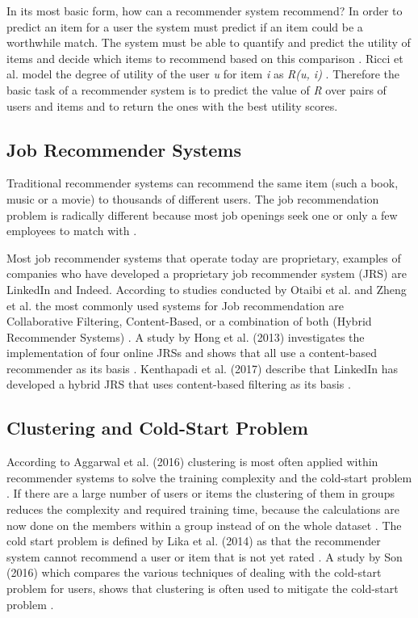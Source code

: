 In its most basic form, how can a recommender system recommend? 
In order to predict an item for a user the system must predict if an item could be a worthwhile match. 
The system must be able to quantify and predict the utility of items and decide which items to recommend based on this comparison \cite{2015RecommenderHandbook}. 
Ricci et al. model the degree of utility of the user \textit{u} for item \textit{i} as \textit{R(u, i)} \cite{Ricci2018RecommenderTechniques}. 
Therefore the basic task of a recommender system is to predict the value of \textit{R} over pairs of users and items and to return the ones with the best utility scores.

\subsection{Job Recommender Systems}
\label{sec:jrs}
Traditional recommender systems can recommend the same item (such a book, music or a movie) to thousands of different users. 
The job recommendation problem is radically different because most job openings seek one or only a few employees to match with \cite{kenthapadi2017personalized}.

Most job recommender systems that operate today are proprietary, examples of companies who have developed a proprietary job recommender system (JRS) are LinkedIn and Indeed. 
According to studies conducted by Otaibi et al. and Zheng et al. the most commonly used  systems for Job recommendation are Collaborative Filtering, Content-Based, or a combination of both (Hybrid Recommender Systems) \cite{T.Al-Otaibi2012ASystems} \cite{Zheng2012JobSurvey}.
A study by Hong et al. (2013) investigates the implementation of four online JRSs and shows that all use a content-based recommender as its basis \cite{hong2013job}.
Kenthapadi et al. (2017) describe that LinkedIn has developed a hybrid JRS that uses content-based filtering as its basis \cite{kenthapadi2017personalized}.

\subsection{Clustering and Cold-Start Problem}
\label{sec:ccs}
According to Aggarwal et al. (2016) clustering is most often applied within recommender systems to solve the training complexity and the cold-start problem \cite{aggarwal2016recommender}.
If there are a large number of users or items the clustering of them in groups reduces the complexity and required training time, because the calculations are now done on the members within a group instead of on the whole dataset \cite{aggarwal2016content}.
The cold start problem is defined by Lika et al. (2014) as that the recommender system cannot recommend a user or item that is not yet rated \cite{lika2014facing}.
A study by Son (2016) which compares the various techniques of dealing with the cold-start problem for users, shows that clustering is often used to mitigate the cold-start problem \cite{son2016dealing}.

